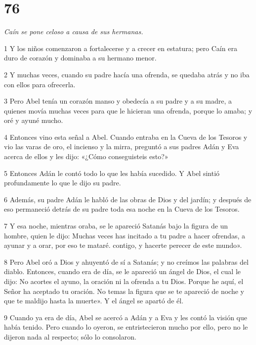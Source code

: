 \chapter{76}

\par \textit{Caín se pone celoso a causa de sus hermanas.}

\par 1 Y los niños comenzaron a fortalecerse y a crecer en estatura; pero Caín era duro de corazón y dominaba a su hermano menor.

\par 2 Y muchas veces, cuando su padre hacía una ofrenda, se quedaba atrás y no iba con ellos para ofrecerla.

\par 3 Pero Abel tenía un corazón manso y obedecía a su padre y a su madre, a quienes movía muchas veces para que le hicieran una ofrenda, porque lo amaba; y oré y ayuné mucho.

\par 4 Entonces vino esta señal a Abel. Cuando entraba en la Cueva de los Tesoros y vio las varas de oro, el incienso y la mirra, preguntó a sus padres Adán y Eva acerca de ellos y les dijo: «¿Cómo conseguisteis esto?»

\par 5 Entonces Adán le contó todo lo que les había sucedido. Y Abel sintió profundamente lo que le dijo su padre.

\par 6 Además, su padre Adán le habló de las obras de Dios y del jardín; y después de eso permaneció detrás de su padre toda esa noche en la Cueva de los Tesoros.

\par 7 Y esa noche, mientras oraba, se le apareció Satanás bajo la figura de un hombre, quien le dijo: Muchas veces has incitado a tu padre a hacer ofrendas, a ayunar y a orar, por eso te mataré. contigo, y hacerte perecer de este mundo».

\par 8 Pero Abel oró a Dios y ahuyentó de sí a Satanás; y no creímos las palabras del diablo. Entonces, cuando era de día, se le apareció un ángel de Dios, el cual le dijo: No acortes el ayuno, la oración ni la ofrenda a tu Dios. Porque he aquí, el Señor ha aceptado tu oración. No temas la figura que se te apareció de noche y que te maldijo hasta la muerte». Y el ángel se apartó de él.

\par 9 Cuando ya era de día, Abel se acercó a Adán y a Eva y les contó la visión que había tenido. Pero cuando lo oyeron, se entristecieron mucho por ello, pero no le dijeron nada al respecto; sólo lo consolaron.

